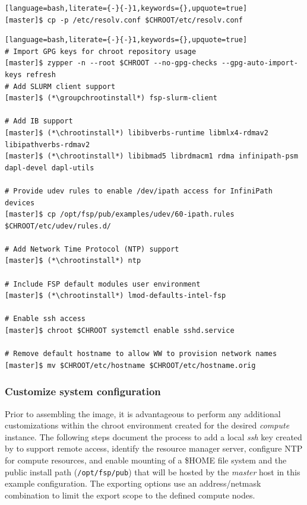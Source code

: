 \documentclass[letterpaper]{article}
\newcommand{\chrootinstall}{zypper -n --root \$CHROOT install}
\newcommand{\groupchrootinstall}{zypper -n --root \$CHROOT install -t pattern}
\begin{document}
\begin{lstlisting}[language=bash,literate={-}{-}1,keywords={},upquote=true]
[master]$ cp -p /etc/resolv.conf $CHROOT/etc/resolv.conf
\end{lstlisting}

\begin{lstlisting}[language=bash,literate={-}{-}1,keywords={},upquote=true]
# Import GPG keys for chroot repository usage
[master]$ zypper -n --root $CHROOT --no-gpg-checks --gpg-auto-import-keys refresh
# Add SLURM client support
[master]$ (*\groupchrootinstall*) fsp-slurm-client

# Add IB support
[master]$ (*\chrootinstall*) libibverbs-runtime libmlx4-rdmav2 libipathverbs-rdmav2
[master]$ (*\chrootinstall*) libibmad5 librdmacm1 rdma infinipath-psm dapl-devel dapl-utils

# Provide udev rules to enable /dev/ipath access for InfiniPath devices
[master]$ cp /opt/fsp/pub/examples/udev/60-ipath.rules $CHROOT/etc/udev/rules.d/

# Add Network Time Protocol (NTP) support
[master]$ (*\chrootinstall*) ntp

# Include FSP default modules user environment
[master]$ (*\chrootinstall*) lmod-defaults-intel-fsp

# Enable ssh access 
[master]$ chroot $CHROOT systemctl enable sshd.service

# Remove default hostname to allow WW to provision network names
[master]$ mv $CHROOT/etc/hostname $CHROOT/etc/hostname.orig
\end{lstlisting}

\subsubsection{Customize system configuration} \label{sec:master_customization}

Prior to assembling the image, it is advantageous to perform any additional
customizations within the chroot environment created for the desired {\em
  compute} instance. The following steps document the process to add a local
{\em ssh} key created by \Warewulf{} to support remote access, identify the
resource manager server, configure NTP for compute resources, and enable \NFS{}
mounting of a \$HOME file system and the public \FSP{} install path
(\texttt{/opt/fsp/pub}) that will be hosted by the {\em master} host in this
example configuration.  The \NFS{} exporting options use an address/netmask
combination to limit the export scope to the defined compute nodes.
\end{document}
